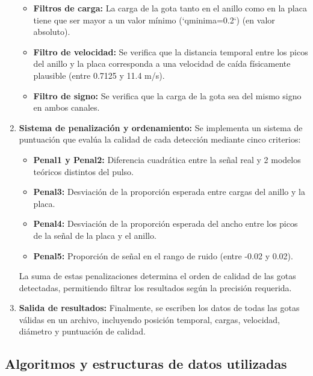 \documentclass[12pt,a4paper]{article}
\begin{document}
\begin{enumerate}
\begin{itemize}
\item \textbf{Filtros de carga:} La carga de la gota tanto en el anillo como en la placa tiene
que ser mayor a un valor mínimo (`qminima=0.2`) (en valor absoluto).

\item \textbf{Filtro de velocidad:} Se verifica que la distancia temporal entre los picos del
anillo y la placa corresponda a una velocidad de caída físicamente plausible
(entre 0.7125 y 11.4 m/s).

\item \textbf{Filtro de signo:} Se verifica que la carga de la gota sea del mismo signo en
ambos canales.
\end{itemize}

\item \textbf{Sistema de penalización y ordenamiento:} Se implementa un sistema de puntuación que evalúa la calidad de cada detección mediante cinco criterios:

\begin{itemize}

    \item \textbf{Penal1 y Penal2:} Diferencia cuadrática entre la señal real y 2 modelos teóricos distintos
    del pulso.
    \item \textbf{Penal3:} Desviación de la proporción esperada entre cargas del anillo y la placa.
    \item \textbf{Penal4:} Desviación de la proporción esperada del ancho entre los picos de la
señal de la placa y el anillo.
    \item \textbf{Penal5:} Proporción de señal en el rango de ruido (entre -0.02 y 0.02).
\end{itemize}
    La suma de estas penalizaciones determina el orden de calidad de las gotas detectadas, permitiendo filtrar los resultados según la precisión requerida.

\item \textbf{Salida de resultados:} Finalmente, se escriben los datos de todas las gotas válidas
en un archivo, incluyendo posición temporal, cargas, velocidad, diámetro y puntuación de calidad.


\end{enumerate}

\subsection{Algoritmos y estructuras de datos utilizadas}
\lhead{}
\end{document}
